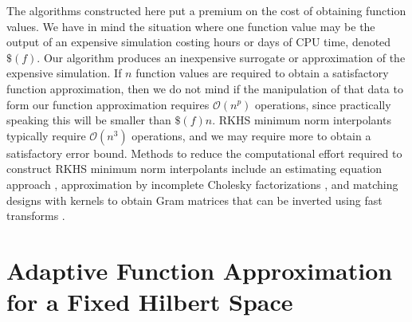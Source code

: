 \documentclass[]{mcom-l}
\theoremstyle{remark}
\newcommand{\Order}{\mathcal{O}}
\begin{document}
The algorithms constructed here put a premium on the cost of obtaining function values.  We have in mind the situation where one function value may be the output of an expensive simulation costing hours or days of CPU time, denoted $\$(f)$.  Our algorithm produces an inexpensive surrogate or approximation of the expensive simulation.  If $n$ function values are required to obtain a satisfactory function approximation, then we do not mind if the manipulation of that data to form our function approximation requires $\Order(n^p)$ operations, since practically speaking this will be smaller than $\$(f) n$.  RKHS minimum  norm interpolants typically require $\Order(n^3)$ operations, and we may require more to obtain a satisfactory error bound.  Methods to reduce the computational effort required to construct RKHS minimum norm interpolants include an estimating equation approach \cite{AniCheSte16a}, approximation by incomplete Cholesky factorizations \cite{OwhEtal19a}, and matching designs with kernels to obtain Gram matrices that can be inverted using fast transforms \cite{RatHic19a}.


\section{Adaptive Function Approximation for a Fixed Hilbert Space} \label{sec:fixedF}

\end{document}
